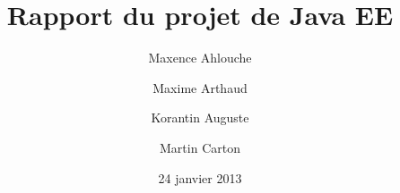 \documentclass{scrartcl}
\begin{document}
\title{Rapport du projet de Java EE}
\author{Maxence Ahlouche \and Maxime Arthaud \and Korantin Auguste \and Martin Carton}

\date{24 janvier 2013}
\maketitle
\end{document}
